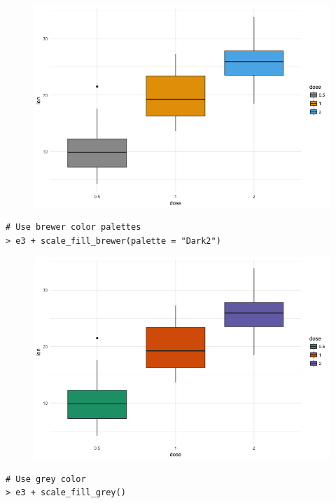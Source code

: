 \begin{figure}[H]\begin{center}\includegraphics[scale=1 ]{ilu/bg83.png}\end{center}\end{figure}
\begin{lstlisting}[language=html]
# Use brewer color palettes
> e3 + scale_fill_brewer(palette = "Dark2")
\end{lstlisting}
\begin{figure}[H]\begin{center}\includegraphics[scale=1 ]{ilu/bg84.png}\end{center}\end{figure}
\begin{lstlisting}[language=html]
# Use grey color
> e3 + scale_fill_grey()
\end{lstlisting}

